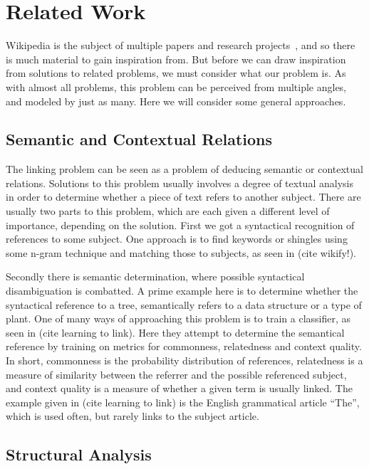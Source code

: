 \section{Related Work}\label{sec:related_work}

Wikipedia is the subject of multiple papers and research projects~\cite{wiki-research-newsletter}, and so there is much material to gain inspiration from. But before we can draw inspiration from solutions to related problems, we must consider what our problem is. As with almost all problems, this problem can be perceived from multiple angles, and modeled by just as many. Here we will consider some general approaches.

\subsection{Semantic and Contextual Relations}\label{related_semantic_contextual}

The linking problem can be seen as a problem of deducing semantic or contextual relations. Solutions to this problem usually involves a degree of textual analysis in order to determine whether a piece of text refers to another subject. There are usually two parts to this problem, which are each given a different level of importance, depending on the solution. First we got a syntactical recognition of references to some subject. One approach is to find keywords or shingles using some n-gram technique and matching those to subjects, as seen in (cite wikify!). 

Secondly there is semantic determination, where possible syntactical disambiguation is combatted. A prime example here is to determine whether the syntactical reference to a tree, semantically refers to a data structure or a type of plant. One of many ways of approaching this problem is to train a classifier, as seen in (cite learning to link). Here they attempt to determine the semantical reference by training on metrics for commonness, relatedness and context quality. In short, commonness is the probability distribution of references, relatedness is a measure of similarity between the referrer and the possible referenced subject, and context quality is a measure of whether a given term is usually linked. The example given in (cite learning to link) is the English grammatical article \enquote{The}, which is used often, but rarely links to the subject article.

\subsection{Structural Analysis}\label{related_structural_analysis}

